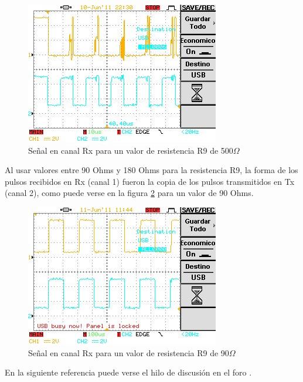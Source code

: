 \begin{figure}[H]
\centering
  \begin{center}
  \includegraphics{Imagenes/500.jpg}
  \end{center}
  \caption{Señal en canal Rx para un valor de resistencia R9 de 500$\Omega$}\label{Fig:pulsosRx} 
\end{figure}

 Al usar valores entre 90 Ohms y 180 Ohms para la resistencia R9, la forma de los pulsos recibidos en Rx (canal 1) fueron la copia de los pulsos transmitidos en Tx (canal 2), como puede verse en la figura \ref{Fig:pulsosRx2} para un valor de 90 Ohms. 
 
\begin{figure}[H]
\centering
  \begin{center}
  \includegraphics{Imagenes/90.jpg}
  \end{center}
  \caption{Señal en canal Rx para un valor de resistencia R9 de 90$\Omega$}\label{Fig:pulsosRx2} 
\end{figure}
 
En la siguiente referencia puede verse el hilo de discusión en el foro \cite{ForoTI}.

